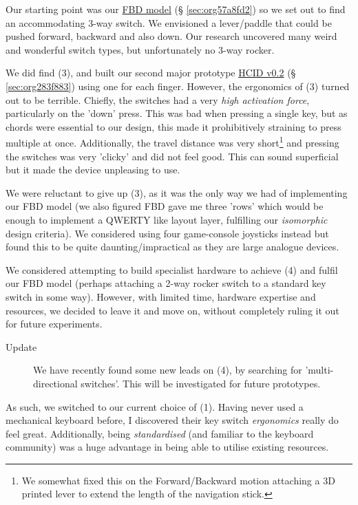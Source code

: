 \documentclass[logo,bsc,singlespacing,parskip]{infthesis}
\begin{document}
Our starting point was our \hyperref[sec:org57a8fd2]{FBD model} (§ \ref{sec:org57a8fd2}) so we set out to find an accommodating 3-way switch.
We envisioned a lever/paddle that could be pushed forward, backward and also down.
Our research uncovered many weird and wonderful switch types, but unfortunately no 3-way rocker.

We did find (3), and built our second major prototype \hyperref[sec:org283f883]{HCID v0.2} (§ \ref{sec:org283f883}) using one for each finger.
However, the ergonomics of (3) turned out to be terrible.
Chiefly, the switches had a very \emph{high activation force}, particularly on the 'down' press.
This was bad  when pressing a single key, but as chords were essential to our design, this made it prohibitively straining to press multiple at once.
Additionally, the travel distance was very short\footnote{We somewhat fixed this on the Forward/Backward motion attaching a 3D printed lever to extend the length of the navigation stick.} and pressing the switches was very 'clicky' and did not feel good.
This can sound superficial but it made the device unpleasing to use.

We were reluctant to give up (3), as it was the only way we had of implementing our FBD model (we also figured FBD gave me three 'rows' which would be enough to implement a QWERTY like layout layer, fulfilling our \emph{isomorphic} design criteria).
We considered using four game-console joysticks instead but found this to be quite daunting/impractical as they are large analogue devices.

We considered attempting to build specialist hardware to achieve (4) and fulfil our FBD model (perhaps attaching a 2-way rocker switch to a standard key switch in some way).
However, with limited time, hardware expertise and resources, we decided to leave it and move on, without completely ruling it out for future experiments. \\

\begin{mdframed}
\begin{description}
\item[{Update}] We have recently found some new leads on (4), by searching for 'multi-directional switches'.
This will be investigated for future prototypes.
\end{description}
\end{mdframed}


As such, we switched to our current choice of (1).
Having never used a mechanical keyboard before, I discovered their key switch \emph{ergonomics} really do feel great.
Additionally, being \emph{standardised} (and familiar to the keyboard community) was a huge advantage in being able to utilise existing resources.
\end{document}
